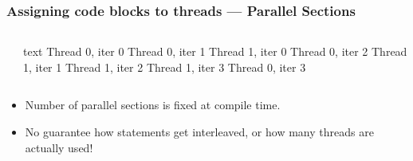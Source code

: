 \documentclass[]{beamer}
\begin{document}
\begin{frame}[fragile]
  \frametitle{Assigning code blocks to threads --- Parallel Sections}
  \begin{columns}[t]%
    \begin{column}{0.65\textwidth}
    \end{column}
    \begin{column}{0.4\textwidth}
      \begin{ccode}[]
        {text}
        Thread 0, iter 0
        Thread 0, iter 1
          Thread 1, iter 0
        Thread 0, iter 2
          Thread 1, iter 1
          Thread 1, iter 2
          Thread 1, iter 3
        Thread 0, iter 3\end{ccode}
    \end{column}
  \end{columns}
  \begin{itemize}
  \item Number of parallel sections is fixed at compile time.
  \item No guarantee how statements get interleaved, or how many threads are actually used!
  \end{itemize}
\end{frame}
\end{document}

